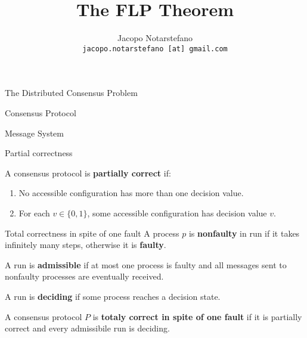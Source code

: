 \documentclass[12pt]{beamer}
\title{The FLP Theorem}
\author[Jacopo Notarstefano]{
  Jacopo Notarstefano\\
  \texttt{jacopo.notarstefano [at] gmail.com}
}
\date{}
\begin{document}
  \begin{frame}[plain]
    \titlepage
  \end{frame}

  \begin{frame}{The Distributed Consensus Problem}
    \begin{definition}{}
    \end{definition}
  \end{frame}

  \begin{frame}{Consensus Protocol}
  \end{frame}

  \begin{frame}{Message System}
  \end{frame}

  \begin{frame}{Partial correctness}
    \begin{definition}
      A consensus protocol is \textbf{partially correct} if:
      \begin{enumerate}
        \item No accessible configuration has more than one decision value.
        \item For each \(v\in \{0,1\}\), some accessible configuration has decision value \(v\).
      \end{enumerate}
    \end{definition}
  \end{frame}

  \begin{frame}{Total correctness in spite of one fault}
    A process \(p\) is \textbf{nonfaulty} in run if it takes infinitely many steps, otherwise it is \textbf{faulty}.

    \vspace{0.25cm}

    A run is \textbf{admissible} if at most one process is faulty and all messages sent to nonfaulty processes are eventually received.

    \vspace{0.25cm}

    A run is \textbf{deciding} if some process reaches a decision state.

    \vspace{0.25cm}

    \begin{definition}
      A consensus protocol \(P\) is \textbf{totaly correct in spite of one fault} if it is partially correct and every admissibile run is deciding.
    \end{definition}
  \end{frame}
\end{document}

